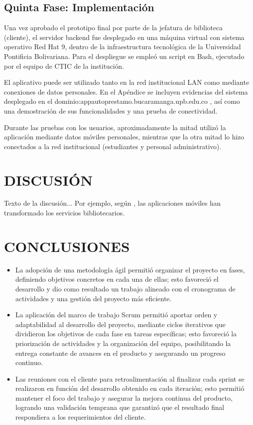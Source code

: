 \documentclass[spanish]{ieee_upb}
\begin{document}
\subsection{Quinta Fase: Implementación}
Una vez aprobado el prototipo final por parte de la jefatura de biblioteca (cliente), el servidor backend fue desplegado en una máquina virtual con sistema operativo Red Hat 9, dentro de la infraestructura tecnológica de la Universidad Pontificia Bolivariana. Para el despliegue se empleó un script en Bash, ejecutado por el equipo de CTIC de la institución.
\vspace{0.3 cm}

El aplicativo puede ser utilizado tanto en la red institucional LAN como mediante conexiones de datos personales. En el Apéndice se incluyen evidencias del sistema desplegado en el dominio:appautoprestamo.bucaramanga.upb.edu.co , así como una demostración de sus funcionalidades y una prueba de conectividad.
\vspace{0.3 cm}

Durante las pruebas con los usuarios, aproximadamente la mitad utilizó la aplicación mediante datos móviles personales, mientras que la otra mitad lo hizo conectados a la red institucional (estudiantes y personal administrativo).

\newpage
\section{DISCUSIÓN}
Texto de la discusión... Por ejemplo, según \cite{singh2023mobile}, las aplicaciones móviles han transformado los servicios bibliotecarios.

\newpage
\section{CONCLUSIONES}
\begin{itemize}
    \item La adopción de una metodología ágil permitió organizar el proyecto en fases, definiendo objetivos concretos en cada una de ellas; esto favoreció el desarrollo y dio como resultado un trabajo alineado con el cronograma de actividades y una gestión del proyecto más eficiente.
    \item La aplicación del marco de trabajo Scrum permitió aportar orden y adaptabilidad al desarrollo del proyecto, mediante ciclos iterativos que dividieron los objetivos de cada fase en tareas específicas; esto favoreció la priorización de actividades y la organización del equipo, posibilitando la entrega constante de avances en el producto y asegurando un progreso continuo.
    \item Las reuniones con el cliente para retroalimentación al finalizar cada sprint se realizaron en función del desarrollo obtenido en cada iteración; esto permitió mantener el foco del trabajo y asegurar la mejora continua del producto, logrando una validación temprana que garantizó que el resultado final respondiera a los requerimientos del cliente.
\end{itemize}
\end{document}
